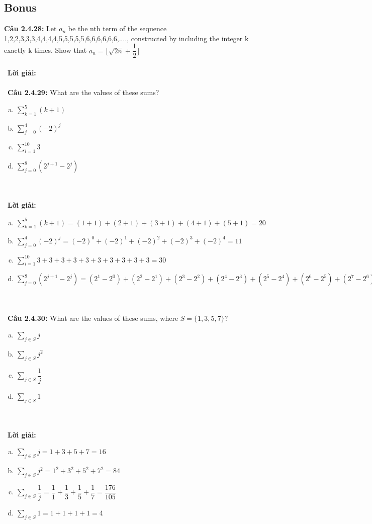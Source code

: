 \documentclass[a4paper]{article}
\begin{document}
\subsection{Bonus}
\textbf{Câu 2.4.28: } Let $a_{n}$ be the nth term of the sequence 1,2,2,3,3,3,4,4,4,4,5,5,5,5,5,6,6,6,6,6,6,...., constructed by including the integer k exactly k times. Show that $a_{n}= \lfloor \sqrt{2n}+\dfrac{1}{2} \rfloor$ \\\ \\\
\textbf{Lời giải:} \\\ \\\
\textbf{Câu 2.4.29: } What are the values of these sums?
\begin{enumerate}[a)]
\item $\sum_{k=1}^{5}(k+1)$
\item $\sum_{j=0}^{4}(-2)^{j}$
\item $\sum_{i=1}^{10}3$
\item $\sum_{j=0}^{8}(2^{j+1}-2^{j})$
\end{enumerate} \\\ \\\
\textbf{Lời giải:} \begin{enumerate}[a)]
\item  $\sum_{k=1}^{5}(k+1)=(1+1)+(2+1)+(3+1)+(4+1)+(5+1)=20$
\item $\sum_{j=0}^{4}(-2)^{j}=(-2)^{0}+(-2)^{1}+(-2)^{2}+(-2)^{3}+(-2)^{4}=11$
\item  $\sum_{i=1}^{10}3+3+3+3+3+3+3+3+3+3=30$
\item $\sum_{j=0}^{8}(2^{j+1}-2^{j})=(2^{1}-2^{0})+(2^{2}-2^{1})+(2^{3}-2^{2})+(2^{4}-2^{3})+(2^{5}-2^{4})+(2^{6}-2^{5})+(2^{7}-2^{6})+(2^{8}-2^{7})+(2^{9}-2^{8})=2^{9}-2^{0}=511$
\end{enumerate} \\\ \\\
\textbf{Câu 2.4.30: } What are the values of these sums, where $S=\{1,3,5,7\}$?
\begin{enumerate}[a)]
\item $\sum_{j \in S}j$
\item $\sum_{j \in S}j^{2}$
\item $\sum_{j \in S}\dfrac{1}{j}$
\item $\sum_{j \in S}1$
\end{enumerate} \\\ \\\
\textbf{Lời giải:} \begin{enumerate}[a)]
\item $\sum_{j \in S}j=1+3+5+7=16$
\item $\sum_{j \in S}j^{2}=1^{2}+3^{2}+5^{2}+7^{2}=84$
\item $\sum_{j \in S}\dfrac{1}{j}=\dfrac{1}{1}+\dfrac{1}{3}+\dfrac{1}{5}+\dfrac{1}{7}=\dfrac{176}{105}$
\item $\sum_{j \in S}1=1+1+1+1=4$
\end{enumerate} \\\ \\\
\end{document}

